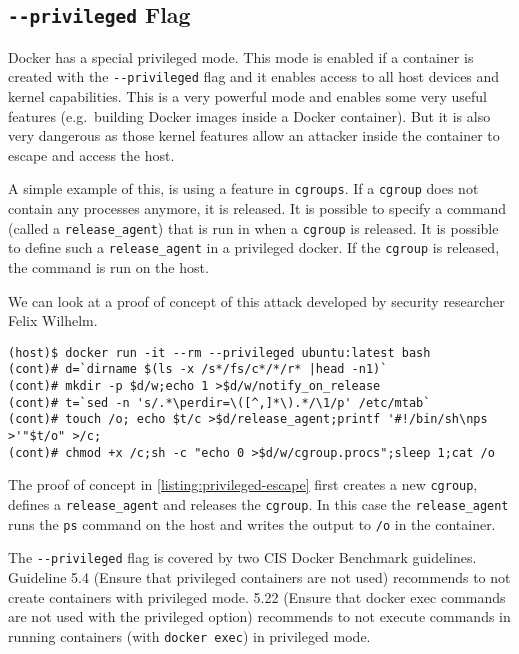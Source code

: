 \subsection{\texorpdfstring{\lstinline{--privileged}}{--privileged} Flag}\label{subsection:privileged}

Docker has a special privileged mode\cite{Docker-in-Docker-blog}. This mode is enabled if a container is created with the \lstinline{--privileged} flag and it enables access to all host devices and kernel capabilities. This is a very powerful mode and enables some very useful features (e.g.\ building Docker images inside a Docker container). But it is also very dangerous as those kernel features allow an attacker inside the container to escape and access the host.

\medskip

A simple example of this, is using a feature in \lstinline{cgroups}\cite{CGroup-Docs}. If a \lstinline{cgroup} does not contain any processes anymore, it is released. It is possible to specify a command (called a \lstinline{release_agent}) that is run in when a \lstinline{cgroup} is released. It is possible to define such a \lstinline{release_agent} in a privileged docker. If the \lstinline{cgroup} is released, the command is run on the host\cite{TrailOfBits-Docker-Escape}.

\medskip

We can look at a proof of concept of this attack developed by security researcher Felix Wilhelm\cite{Felix-Wilhem-Tweet}.
\begin{lstlisting}[caption={Privileged container escape using \lstinline{cgroups}.},captionpos=b,label={listing:privileged-escape}]
(host)$ docker run -it --rm --privileged ubuntu:latest bash
(cont)# d=`dirname $(ls -x /s*/fs/c*/*/r* |head -n1)`
(cont)# mkdir -p $d/w;echo 1 >$d/w/notify_on_release
(cont)# t=`sed -n 's/.*\perdir=\([^,]*\).*/\1/p' /etc/mtab`
(cont)# touch /o; echo $t/c >$d/release_agent;printf '#!/bin/sh\nps >'"$t/o" >/c;
(cont)# chmod +x /c;sh -c "echo 0 >$d/w/cgroup.procs";sleep 1;cat /o
\end{lstlisting}

The proof of concept in \autoref{listing:privileged-escape} first creates a new \lstinline{cgroup}, defines a \lstinline{release_agent} and releases the \lstinline{cgroup}. In this case the \lstinline{release_agent} runs the \lstinline{ps} command on the host and writes the output to \lstinline{/o} in the container.

\medskip

The \lstinline{--privileged} flag is covered by two CIS Docker Benchmark guidelines. Guideline 5.4 (Ensure that privileged containers are not used) recommends to not create containers with privileged mode. 5.22 (Ensure that docker exec commands are not used with the privileged option) recommends to not execute commands in running containers (with \lstinline{docker exec}) in privileged mode.
